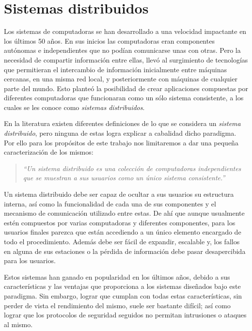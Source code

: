\section{Sistemas distribuidos}
\label{distributed_systems}

Los sistemas de computadoras se han desarrollado a una velocidad impactante en
los últimos 50 años. En sus inicios las computadoras eran componentes autónomas
e independientes que no podían comunicarse unas con otras. Pero la necesidad de
compartir información entre ellas, llevó al surgimiento de tecnologías que
permitieran el intercambio de información inicialmente entre máquinas cercanas,
en una misma red local, y posteriormente con máquinas de cualquier parte del
mundo. Esto planteó la posibilidad de crear aplicaciones compuestas por
diferentes computadoras que funcionaran como un sólo sistema consistente, a los
cuales se les conoce como \emph{sistemas distribuidos}.

En la literatura existen diferentes definiciones de lo que se considera un
\emph{sistema distribuido}, pero ninguna de estas logra explicar a cabalidad
dicho paradigma. Por ello para los propósitos de este trabajo nos limitaremos a
dar una pequeña caracterización de los mismos\cite{Tanenbaum2007}: 
\begin{quotation}
 \emph{``Un sistema distribuido es una colección de computadoras independientes
  que se muestran a sus usuarios como un único sistema
  consistente.''}
\end{quotation}

Un sistema distribuido debe ser capaz de ocultar a sus usuarios su estructura
interna, así como la funcionalidad de cada una de sus componentes y el mecanismo
de comunicación utilizado entre estas. De ahí que aunque usualmente estén compuestos 
por varias computadoras y diferentes componentes, para los usuarios finales parezca 
que están accediendo a un único elemento encargado de todo el procedimiento. Además 
debe ser fácil de expandir, escalable y, los fallos en alguna de sus estaciones o la 
pérdida de información debe pasar desapercibida para los usuarios\cite{Tanenbaum2007}.

Estos sistemas han ganado en popularidad en los últimos años, debido a sus
características y las ventajas que proporciona a los sistemas diseñados bajo
este paradigma. Sin embargo, lograr que cumplan con todas estas características,
sin perder de vista el rendimiento del mismo, suele ser bastante difícil; así
como lograr que los protocolos de seguridad seguidos no permitan intrusiones o
ataques al mismo.

